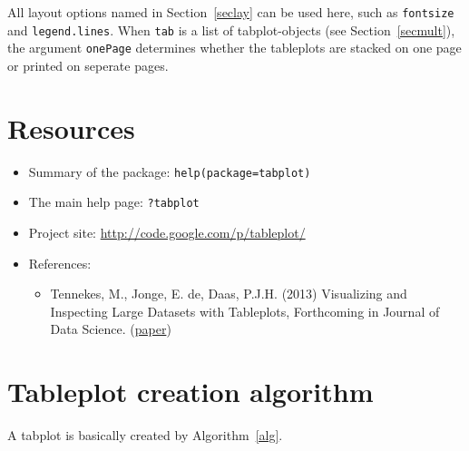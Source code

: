 \documentclass[11pt, fleqn, a4paper]{article}\usepackage[]{graphicx}\usepackage[]{color}
\begin{document}
All layout options named in Section~\ref{seclay} can be used here, such as {\tt fontsize} and {\tt legend.lines}. When {\tt tab} is a list of tabplot-objects (see Section~\ref{secmult}), the argument {\tt onePage} determines whether the tableplots are stacked on one page or printed on seperate pages.

\newpage

\section*{Resources}

\begin{itemize}
\item Summary of the package: {\tt help(package=tabplot)}
\item The main help page: {\tt ?tabplot}
\item Project site: \url{http://code.google.com/p/tableplot/}
\item References:
\begin{itemize}
\item Tennekes, M., Jonge, E. de, Daas, P.J.H. (2013) Visualizing and Inspecting Large Datasets with Tableplots, Forthcoming in Journal of Data Science. (\href{http://www.jds-online.com/file_download/379/JDS-1108.pdf}{paper})
\end{itemize}
\end{itemize}


\appendix
\newpage
\section{Tableplot creation algorithm}\label{secalg}
A tabplot is basically created by Algorithm~\ref{alg}.
\end{document}
